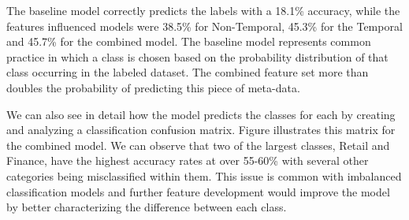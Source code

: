 The baseline model correctly predicts the labels with a 18.1\% accuracy, while the features influenced models were 38.5\% for Non-Temporal, 45.3\% for the Temporal and 45.7\% for the combined model.  The baseline model represents common practice in which a class is chosen based on the probability distribution of that class occurring in the labeled dataset. The combined feature set more than doubles the probability of predicting this piece of meta-data.

We can also see in detail how the model predicts the classes for each by creating and analyzing a classification confusion matrix. Figure  illustrates this matrix for the combined model. We can observe that two of the largest classes, Retail and Finance, have the highest accuracy rates at over 55-60\% with several other categories being misclassified within them.  This issue is common with imbalanced classification models and further feature development would improve the model by better characterizing the difference between each class.